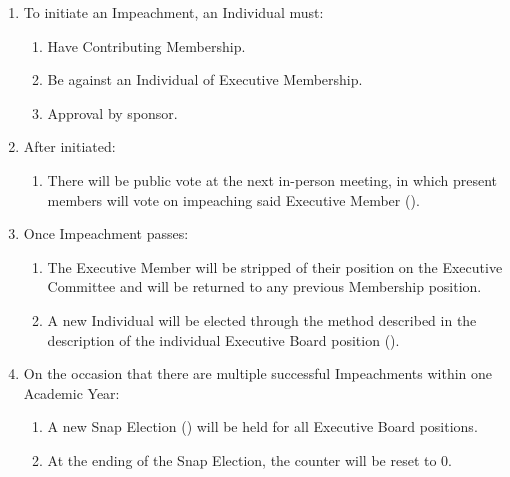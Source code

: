 
\begin{enumerate}
	\item To initiate an Impeachment, an Individual must:
		\begin{enumerate}
			\item Have Contributing Membership.

			\item Be against an Individual of Executive Membership.

			\item Approval by sponsor.
		\end{enumerate}

	\item After initiated:
		\begin{enumerate}
			\item There will be public vote at the next in-person meeting, in which
				present members will vote on impeaching said Executive Member ().
		\end{enumerate}

	\item Once Impeachment passes:
		\begin{enumerate}
			\item The Executive Member will be stripped of their position on the Executive
				Committee and will be returned to any previous Membership position.

			\item A new Individual will be elected through the method described in the
				description of the individual Executive Board position ().
		\end{enumerate}

	\item On the occasion that there are multiple successful Impeachments within one
		Academic Year:
		\begin{enumerate}
			\item A new Snap Election () will be held for
				all Executive Board positions.

			\item At the ending of the Snap Election, the counter will be reset to 0.
		\end{enumerate}
\end{enumerate}

